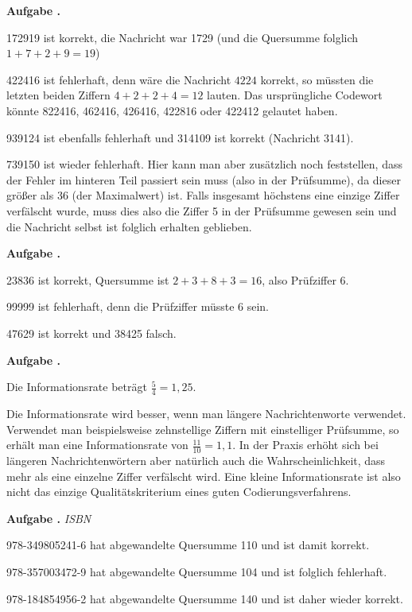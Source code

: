 \documentclass[a4paper,ngerman,12pt]{scrartcl}
\theoremstyle{definition}
\theoremstyle{plain}
\theoremstyle{remark}
\newlength{\aufgabenskip}
\newcounter{aufgabennummer}
\newenvironment{aufgabe}[1]{
	\addtocounter{aufgabennummer}{1}
	\textbf{Aufgabe \theaufgabennummer.} \emph{#1} \par
}{\vspace{\aufgabenskip}}
\begin{document}
\begin{aufgabe}{}
	172919 ist korrekt, die Nachricht war 1729 (und die Quersumme folglich $1+7+2+9=19$)
	
	422416 ist fehlerhaft, denn wäre die Nachricht $4224$ korrekt, so müssten die letzten beiden Ziffern $4+2+2+4=12$ lauten. Das ursprüngliche Codewort könnte 822416, 462416, 426416, 422816 oder 422412 gelautet haben.
	
	939124 ist ebenfalls fehlerhaft und 314109 ist korrekt (Nachricht 3141).
	
	739150 ist wieder fehlerhaft. Hier kann man aber zusätzlich noch feststellen, dass der Fehler im hinteren Teil passiert sein muss (also in der Prüfsumme), da dieser größer als 36 (der Maximalwert) ist. Falls insgesamt höchstens eine einzige Ziffer verfälscht wurde, muss dies also die Ziffer 5 in der Prüfsumme gewesen sein und die Nachricht selbst ist folglich erhalten geblieben.
\end{aufgabe}

\begin{aufgabe}{}
	23836 ist korrekt, Quersumme ist $2+3+8+3=16$, also Prüfziffer $6$.
	
	99999 ist fehlerhaft, denn die Prüfziffer müsste $6$ sein.
	
	47629 ist korrekt und 38425 falsch.
\end{aufgabe}

\begin{aufgabe}{}
	Die Informationsrate beträgt $\frac{5}{4} = 1,25$.
	
	Die Informationsrate wird besser, wenn man längere Nachrichtenworte verwendet. Verwendet man beispielsweise zehnstellige Ziffern mit einstelliger Prüfsumme, so erhält man eine Informationsrate von $\frac{11}{10} = 1,1$. In der Praxis erhöht sich bei längeren Nachrichtenwörtern aber natürlich auch die Wahrscheinlichkeit, dass mehr als eine einzelne Ziffer verfälscht wird. Eine kleine Informationsrate ist also nicht das einzige Qualitätskriterium eines guten Codierungsverfahrens.
\end{aufgabe}

\begin{aufgabe}{ISBN}
	978-349805241-6 hat abgewandelte Quersumme 110 und ist damit korrekt.
	
	978-357003472-9 hat abgewandelte Quersumme 104 und ist folglich fehlerhaft.
	
	978-184854956-2 hat abgewandelte Quersumme 140 und ist daher wieder korrekt.
\end{aufgabe}
\end{document}

